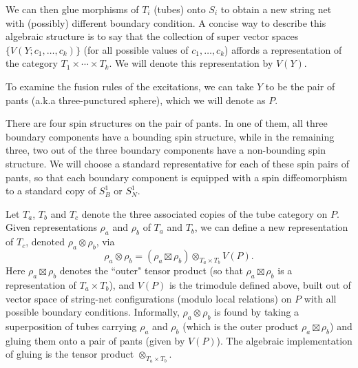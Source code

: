 \documentclass[12pt,a4paper]{article}
\newcommand{\tp}{\otimes}
\newcommand\be            {\begin{equation}}
\newcommand\ee            {\end{equation}}
\newcommand{\kw}[1]{{\color{kwcolor}\footnotesize{(KW) #1}}}
\begin{document}
We can then glue morphisms of $T_i$ (tubes) onto $S_i$ to obtain a new string net with (possibly) different boundary condition.
A concise way to describe this algebraic structure is to say that the collection of super vector spaces $\{V(Y; c_1,\ldots,c_k)\}$
(for all possible values of $c_1,\ldots,c_k$)
affords a representation of the category $T_1\times\cdots\times T_k$.
We will denote this representation by $V(Y)$.

To examine the fusion rules of the excitations, we can take $Y$ to be the 
pair of pants (a.k.a three-punctured sphere), which we will denote as $P$. 

There are four spin structures on the pair of pants. 
In one of them, all three boundary components have a bounding spin structure, while in 
the remaining three, two out of the three boundary components have a non-bounding spin structure.
We will choose a standard representative for each of these spin pairs of pants, 
so that each boundary component is equipped with a spin diffeomorphism to a 
standard copy of $S^1_B$ or $S^1_N$.

Let $T_a$, $T_b$ and $T_c$ denote the three associated copies of the tube category on $P$.
Given representations $\rho_a$ and $\rho_b$ of $T_a$ and $T_b$, we can define a new representation of $T_c$,
denoted $\rho_a\tp\rho_b$, via
\be  \label{tctpdef}
	\rho_a\tp\rho_b = (\rho_a \boxtimes \rho_b) \tp_{T_a\times T_b} V(P) .
\ee
Here $\rho_a \boxtimes \rho_b$ denotes the ``outer" tensor product (so that $\rho_a \boxtimes \rho_b$ is a representation of $T_a\times T_b$), 
and $V(P)$ is the 
trimodule defined above, built out of
vector space of string-net configurations (modulo local relations) on $P$ with all possible boundary conditions. 
Informally, $\rho_a\tp \rho_b$ is found by taking a superposition of tubes carrying $\rho_a$ and $\rho_b$ 
(which is the outer product $\rho_a\boxtimes\rho_b$) and gluing them onto a pair of pants (given by $V(P)$). 
The algebraic implementation of gluing is the tensor product $\tp_{T_a\times T_b}$. 
\end{document}
